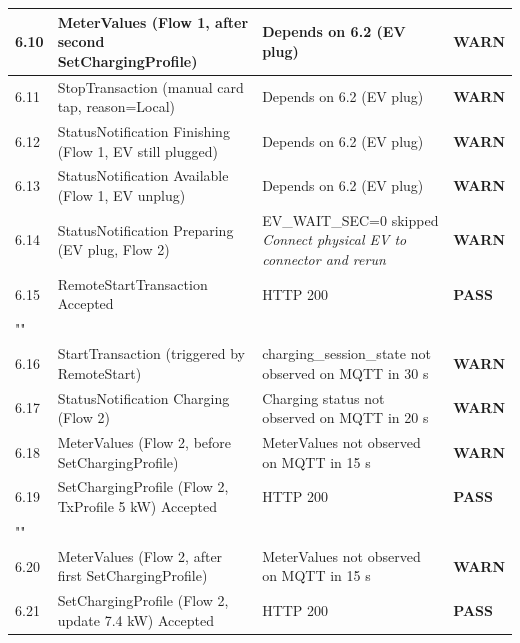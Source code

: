 \documentclass[10pt, a4paper]{article}
\begin{document}
\begin{longtable}{|L{1cm}|L{5.5cm}|M{7cm}|C{1.8cm}|}
\hline
\small 6.10 & \small MeterValues (Flow 1, after second SetChargingProfile) & Depends on 6.2 (EV plug) & \textcolor{warnorange}{\textbf{WARN}} \\
\hline
\small 6.11 & \small StopTransaction (manual card tap, reason=Local) & Depends on 6.2 (EV plug) & \textcolor{warnorange}{\textbf{WARN}} \\
\hline
\small 6.12 & \small StatusNotification Finishing (Flow 1, EV still plugged) & Depends on 6.2 (EV plug) & \textcolor{warnorange}{\textbf{WARN}} \\
\hline
\small 6.13 & \small StatusNotification Available (Flow 1, EV unplug) & Depends on 6.2 (EV plug) & \textcolor{warnorange}{\textbf{WARN}} \\
\hline
\small 6.14 & \small StatusNotification Preparing (EV plug, Flow 2) & EV\_WAIT\_SEC=0  skipped{\newline\normalfont\footnotesize\itshape Connect physical EV to connector and rerun} & \textcolor{warnorange}{\textbf{WARN}} \\
\hline
\small 6.15 & \small RemoteStartTransaction  Accepted & HTTP 200 & \textcolor{passgreen}{\textbf{PASS}} \\
\hline
{} \\
\hline
\small 6.16 & \small StartTransaction (triggered by RemoteStart) & charging\_session\_state not observed on MQTT in 30 s & \textcolor{warnorange}{\textbf{WARN}} \\
\hline
\small 6.17 & \small StatusNotification Charging (Flow 2) & Charging status not observed on MQTT in 20 s & \textcolor{warnorange}{\textbf{WARN}} \\
\hline
\small 6.18 & \small MeterValues (Flow 2, before SetChargingProfile) & MeterValues not observed on MQTT in 15 s & \textcolor{warnorange}{\textbf{WARN}} \\
\hline
\small 6.19 & \small SetChargingProfile (Flow 2, TxProfile 5 kW)  Accepted & HTTP 200 & \textcolor{passgreen}{\textbf{PASS}} \\
\hline
{} \\
\hline
\small 6.20 & \small MeterValues (Flow 2, after first SetChargingProfile) & MeterValues not observed on MQTT in 15 s & \textcolor{warnorange}{\textbf{WARN}} \\
\hline
\small 6.21 & \small SetChargingProfile (Flow 2, update 7.4 kW)  Accepted & HTTP 200 & \textcolor{passgreen}{\textbf{PASS}} \\

\end{longtable}
\end{document}
